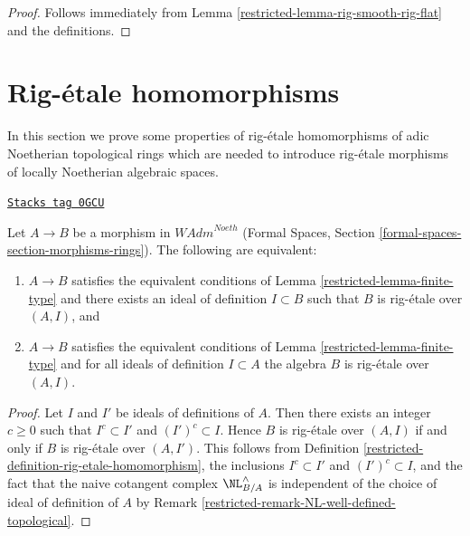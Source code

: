 \begin{proof}

Follows immediately from Lemma \ref{restricted-lemma-rig-smooth-rig-flat}
and the definitions.
\end{proof}

\section{Rig-\'etale homomorphisms}
\label{restricted-section-rig-etale-homomorphisms}
In this section we prove some properties of rig-\'etale homomorphisms
of adic Noetherian topological rings which are needed to introduce
rig-\'etale morphisms of locally Noetherian algebraic spaces.

\begin{lemma}
\label{restricted-lemma-rig-etale-continuous}
\href{https://stacks.math.columbia.edu/tag/0GCU}{\texttt{Stacks tag 0GCU}}

Let $A \to B$ be a morphism in $\textit{WAdm}^{Noeth}$
(Formal Spaces, Section \ref{formal-spaces-section-morphisms-rings}).
The following are equivalent:
\begin{enumerate}
\item[(a)] $A \to B$ satisfies the equivalent conditions of
Lemma \ref{restricted-lemma-finite-type} and there exists an ideal of definition
$I \subset B$ such that $B$ is rig-\'etale over $(A, I)$, and
\item[(b)] $A \to B$ satisfies the equivalent conditions of
Lemma \ref{restricted-lemma-finite-type} and for all ideals of definition
$I \subset A$ the algebra $B$ is rig-\'etale over $(A, I)$.
\end{enumerate}
\end{lemma}

\begin{proof}

Let $I$ and $I'$ be ideals of definitions of $A$. Then there exists an
integer $c \geq 0$ such that $I^c \subset I'$ and $(I')^c \subset I$. Hence
$B$ is rig-\'etale over $(A, I)$ if and only if
$B$ is rig-\'etale over $(A, I')$. This follows from
Definition \ref{restricted-definition-rig-etale-homomorphism},
the inclusions $I^c \subset I'$ and $(I')^c \subset I$, and
the fact that the naive cotangent complex $\NL_{B/A}^\wedge$
is independent of the choice of ideal of definition of $A$ by
Remark \ref{restricted-remark-NL-well-defined-topological}.
\end{proof}

